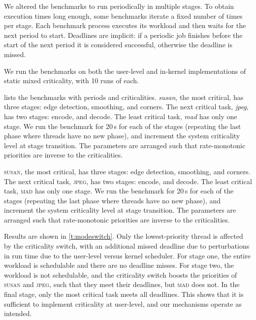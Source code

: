 We altered the benchmarks to run periodically in multiple stages. To obtain
execution times long enough, some benchmarks iterate a fixed number of times per
stage. Each benchmark process executes its workload and then waits for the next period to start.
Deadlines are implicit: if a periodic job finishes before the start of the next period it is
considered successful, otherwise the deadline is missed.

We run the benchmarks on both the user-level and in-kernel implementations of static mixed criticality, with 10 runs of each.

 lists the benchmarks with periods and criticalities.
\textit{susan}, the most critical, has three stages: edge detection, smoothing, and corners. The
next critical task, \textit{jpeg}, has two stages: encode, and decode. The least
critical task, \textit{mad} has only one stage. We run the benchmark
for 20\,s for each of the stages (repeating the last phase where
threads have no new phase), and
increment the system criticality level at stage transition. The parameters are arranged such that
rate-monotonic priorities are inverse to the criticalities.

\textsc{susan}, the most critical, has three stages: edge detection, smoothing, and corners. The
next critical task, \textsc{jpeg}, has two stages: encode, and decode. The least
critical task, \textsc{mad} has only one stage. We run the benchmark
for 20\,s for each of the stages (repeating the last phase where
threads have no new phase), and
increment the system criticality level at stage transition. The parameters are arranged such that rate-monotonic priorities are inverse to the criticalities.

Results are shown in \autoref{t:modeswitch}.
Only the lowest-priority thread is affected by the criticality switch, with an additional missed deadline due to
perturbations in run time due to the user-level versus kernel scheduler.
For stage one, the entire workload is schedulable and
there are no deadline misses. For stage two, the workload is not
schedulable, and the criticality switch boosts the priorities of
\textsc{susan} and \textsc{jpeg}, such that they meet
their deadlines, but
\textsc{mad} does not. In the final stage, only the most critical task
meets all deadlines.
This shows that it is sufficient to implement criticality at user-level, and our mechanisms operate as intended.

